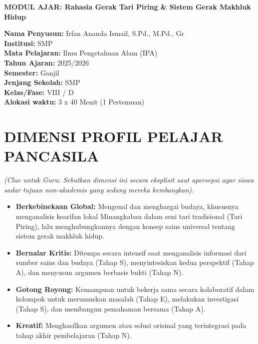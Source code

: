 \documentclass[a4paper,12pt]{article}
\begin{document}
\begin{center}
{\Large\textbf{MODUL AJAR: Rahasia Gerak Tari Piring \& Sistem Gerak Makhluk Hidup}}
\end{center}

\vspace{0.5cm}

\begin{tcolorbox}[mainbox]
\textbf{Nama Penyusun:} Irfan Ananda Ismail, S.Pd., M.Pd., Gr \\
\textbf{Institusi:} SMP \\
\textbf{Mata Pelajaran:} Ilmu Pengetahuan Alam (IPA) \\
\textbf{Tahun Ajaran:} 2025/2026 \\
\textbf{Semester:} Ganjil \\
\textbf{Jenjang Sekolah:} SMP \\
\textbf{Kelas/Fase:} VIII / D \\
\textbf{Alokasi waktu:} 3 x 40 Menit (1 Pertemuan)
\end{tcolorbox}

\section{DIMENSI PROFIL PELAJAR PANCASILA}
\textit{(Clue untuk Guru: Sebutkan dimensi ini secara eksplisit saat apersepsi agar siswa sadar tujuan non-akademis yang sedang mereka kembangkan).}

\begin{itemize}
\item \textbf{Berkebinekaan Global:} Mengenal dan menghargai budaya, khususnya menganalisis kearifan lokal Minangkabau dalam seni tari tradisional (Tari Piring), lalu menghubungkannya dengan konsep sains universal tentang sistem gerak makhluk hidup.
\item \textbf{Bernalar Kritis:} Ditempa secara intensif saat menganalisis informasi dari sumber sains dan budaya (Tahap S), menyintesiskan kedua perspektif (Tahap A), dan menyusun argumen berbasis bukti (Tahap N).
\item \textbf{Gotong Royong:} Kemampuan untuk bekerja sama secara kolaboratif dalam kelompok untuk merumuskan masalah (Tahap E), melakukan investigasi (Tahap S), dan membangun pemahaman bersama (Tahap A).
\item \textbf{Kreatif:} Menghasilkan argumen atau solusi orisinal yang terintegrasi pada tahap akhir pembelajaran (Tahap N).
\end{itemize}
\end{document}
